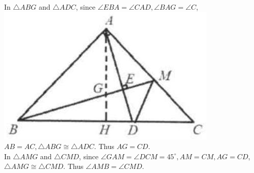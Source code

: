 \documentclass{article}
\begin{document}
In \(\triangle A B G\) and \(\triangle A D C\), since \(\angle E B A=\angle C A D, \angle B A G=\angle C\),\\
\includegraphics[width=\textwidth]{images/reasoning_image_1.jpg} \(A B=A C, \triangle A B G \cong \triangle A D C\). Thus \(A G=C D\).\\
In \(\triangle A M G\) and \(\triangle C M D\), since \(\angle G A M=\angle D C M=45^{\circ}, A M=C M, A G=C D\), \(\triangle A M G \cong \triangle C M D\). Thus \(\angle A M B=\angle C M D\).
\end{document}
